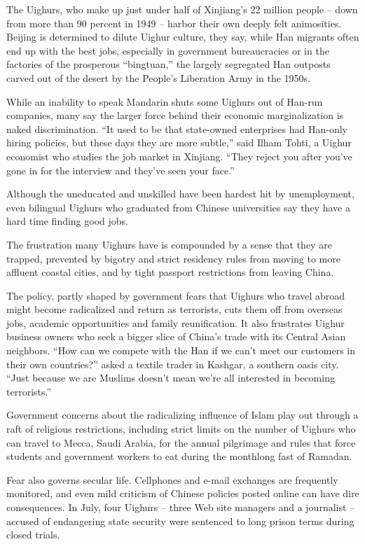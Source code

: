 ﻿\documentclass[12pt]{article}
\begin{document}
The Uighurs, who make up just under half of Xinjiang's 22 million people -- down from more than 90
percent in 1949 -- harbor their own deeply felt animosities. Beijing is determined to dilute Uighur
culture, they say, while Han migrants often end up with the best jobs, especially in government
bureaucracies or in the factories of the prosperous ``bingtuan,'' the largely segregated Han
outposts carved out of the desert by the People's Liberation Army in the 1950s.

While an inability to speak Mandarin shuts some Uighurs out of Han-run companies, many say the
larger force behind their economic marginalization is naked discrimination. ``It used to be that
state-owned enterprises had Han-only hiring policies, but these days they are more subtle,'' said
Ilham Tohti, a Uighur economist who studies the job market in Xinjiang. ``They reject you after
you've gone in for the interview and they've seen your face.''

Although the uneducated and unskilled have been hardest hit by unemployment, even bilingual Uighurs
who graduated from Chinese universities say they have a hard time finding good jobs.

The frustration many Uighurs have is compounded by a sense that they are trapped, prevented by
bigotry and strict residency rules from moving to more affluent coastal cities, and by tight
passport restrictions from leaving China.

The policy, partly shaped by government fears that Uighurs who travel abroad might become
radicalized and return as terrorists, cuts them off from overseas jobs, academic opportunities and
family reunification. It also frustrates Uighur business owners who seek a bigger slice of China's
trade with its Central Asian neighbors. ``How can we compete with the Han if we can't meet our
customers in their own countries?'' asked a textile trader in Kashgar, a southern oasis city. ``Just
because we are Muslims doesn't mean we're all interested in becoming terrorists.''

Government concerns about the radicalizing influence of Islam play out through a raft of religious
restrictions, including strict limits on the number of Uighurs who can travel to Mecca, Saudi
Arabia, for the annual pilgrimage and rules that force students and government workers to eat during
the monthlong fast of Ramadan.

Fear also governs secular life. Cellphones and e-mail exchanges are frequently monitored, and even
mild criticism of Chinese policies posted online can have dire consequences. In July, four Uighurs
-- three Web site managers and a journalist -- accused of endangering state security were sentenced
to long prison terms during closed trials.
\end{document}
